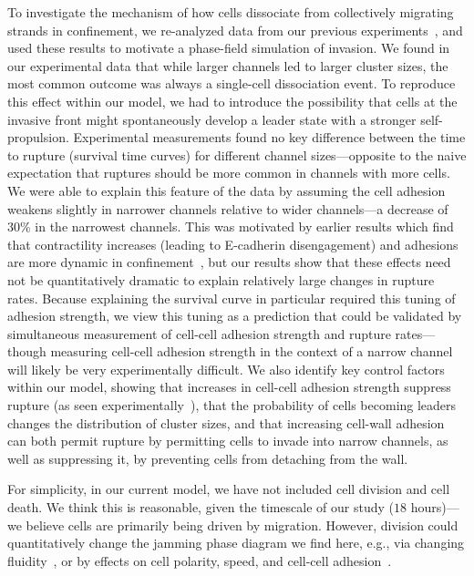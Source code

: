 To investigate the mechanism of how cells dissociate from collectively migrating strands in confinement, we re-analyzed data from our previous experiments~\cite{law2023cytokinesis}, and used these results to motivate a phase-field simulation of invasion.
We found in our experimental data that while larger channels led to larger cluster sizes, the most common outcome was always a single-cell dissociation event.
To reproduce this effect within our model, we had to introduce the possibility that cells at the invasive front might spontaneously develop a leader state with a stronger self-propulsion.
Experimental measurements found no key difference between the time to rupture (survival time curves) for different channel sizes---opposite to the naive expectation that ruptures should be more common in channels with more cells.
We were able to explain this feature of the data by assuming the cell adhesion weakens slightly in narrower channels relative to wider channels---a decrease of 30\% in the narrowest channels.
This was motivated by earlier results which find that contractility increases (leading to E-cadherin disengagement) and adhesions are more dynamic in confinement~\cite{law2023cytokinesis, wisniewski2020dorsoventral, ilina2020cell}, but our results show that these effects need not be quantitatively dramatic to explain relatively large changes in rupture rates.
Because explaining the survival curve in particular required this tuning of adhesion strength, we view this tuning as a prediction that could be validated by simultaneous measurement of cell-cell adhesion strength and rupture rates---though measuring cell-cell adhesion strength in the context of a narrow channel will likely be very experimentally difficult.
We also identify key control factors within our model, showing that increases in cell-cell adhesion strength suppress rupture (as seen experimentally~\cite{law2023cytokinesis}), that the probability of cells becoming leaders changes the distribution of cluster sizes, and that increasing cell-wall adhesion can both permit rupture by permitting cells to invade into narrow channels, as well as suppressing it, by preventing cells from detaching from the wall.

For simplicity, in our current model, we have not included cell division and cell death.
We think this is reasonable, given the timescale of our study ($18$ hours)---we believe cells are primarily being driven by migration.
However, division could quantitatively change the jamming phase diagram we find here, e.g., via changing fluidity~\cite{devany2021cell, czajkowski2019glassy}, or by effects on cell polarity, speed, and cell-cell adhesion~\cite{singh2021rules}.

